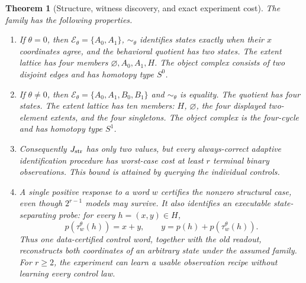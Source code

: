 \documentclass[11pt]{article}
\newtheorem{theorem}{Theorem}[section]
\theoremstyle{definition}
\begin{document}
\begin{theorem}[Structure, witness discovery, and exact experiment cost]
\label{thm:er-family}
The family has the following properties.
\begin{enumerate}[label=(\roman*)]
\item If $\theta=0$, then $\mathcal E_\theta=\{A_0,A_1\}$,
$\sim_\theta$ identifies states exactly when their $x$ coordinates agree,
and the behavioral quotient has two states. The extent lattice has four
members $\varnothing,A_0,A_1,H$. The object complex consists of two disjoint
edges and has homotopy type $S^0$.
\item If $\theta\ne0$, then
$\mathcal E_\theta=\{A_0,A_1,B_0,B_1\}$ and $\sim_\theta$ is equality.
The quotient has four states. The extent lattice has ten members:
$H$, $\varnothing$, the four displayed two-element extents, and the four
singletons. The object complex is the four-cycle and has homotopy type
$S^1$.
\item Consequently $J_{\rm str}$ has only two values, but every always-correct
adaptive identification procedure has worst-case cost at least $r$
terminal binary observations. This bound is attained by querying the
individual controls.
\item A single positive response to a word $w$ certifies the nonzero
structural case, even though $2^{r-1}$ models may survive. It also identifies
an executable state-separating probe: for every $h=(x,y)\in H$,
\[
 p(\tau_w^\theta(h))=x+y,
 \qquad
 y=p(h)+p(\tau_w^\theta(h)).
\]
Thus one data-certified control word, together with the old readout,
reconstructs both coordinates of an arbitrary state under the assumed family.
For $r\ge2$, the experiment can learn a usable observation recipe without
learning every control law.
\end{enumerate}
\end{theorem}
\end{document}
